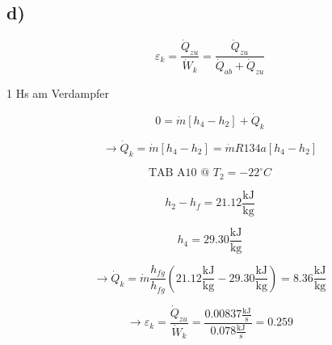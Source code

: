

\subsection*{d)}

\[
\varepsilon_k = \frac{\dot{Q}_{zu}}{\dot{W}_k} = \frac{\dot{Q}_{zu}}{\dot{Q}_{ab} + \dot{Q}_{zu}}
\]

1 Hs am Verdampfer

\[
0 = \dot{m} \left[ h_4 - h_2 \right] + \dot{Q}_k
\]

\[
\rightarrow \dot{Q}_k = \dot{m} \left[ h_4 - h_2 \right] = \dot{m} R134a \left[ h_4 - h_2 \right]
\]

\[
\text{TAB A10 @ } T_2 = -22^\circ C
\]

\[
h_2 - h_f = 21.12 \frac{\text{kJ}}{\text{kg}}
\]

\[
h_4 = 29.30 \frac{\text{kJ}}{\text{kg}}
\]

\[
\rightarrow \dot{Q}_k = \dot{m} \frac{h_{fg}}{h_{fg}} \left( 21.12 \frac{\text{kJ}}{\text{kg}} - 29.30 \frac{\text{kJ}}{\text{kg}} \right) = 8.36 \frac{\text{kJ}}{\text{kg}}
\]

\[
\rightarrow \varepsilon_k = \frac{\dot{Q}_{zu}}{\dot{W}_k} = \frac{0.00837 \frac{\text{kJ}}{\text{s}}}{0.078 \frac{\text{kJ}}{\text{s}}} = 0.259
\]